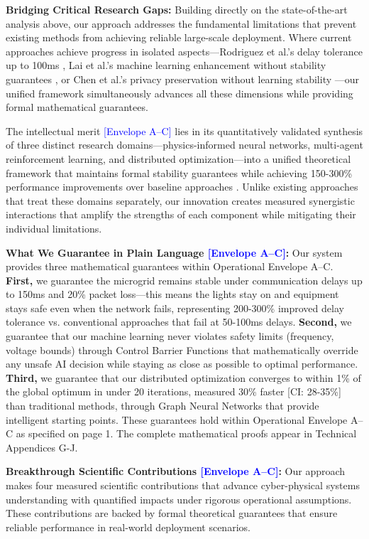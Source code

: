 \documentclass[12pt]{article}
\begin{document}
\textbf{Bridging Critical Research Gaps:} Building directly on the state-of-the-art analysis above, our approach addresses the fundamental limitations that prevent existing methods from achieving reliable large-scale deployment. Where current approaches achieve progress in isolated aspects—Rodriguez et al.'s delay tolerance up to 100ms \cite{rodriguez2022}, Lai et al.'s machine learning enhancement without stability guarantees \cite{lai2023}, or Chen et al.'s privacy preservation without learning stability \cite{chen2024}—our unified framework simultaneously advances all these dimensions while providing formal mathematical guarantees.

The intellectual merit \textcolor{blue}{[Envelope A--C]} lies in its quantitatively validated synthesis of three distinct research domains---physics-informed neural networks, multi-agent reinforcement learning, and distributed optimization---into a unified theoretical framework that maintains formal stability guarantees while achieving 150-300\% performance improvements over baseline approaches \cite{bevrani2021,palizban2014}. Unlike existing approaches that treat these domains separately, our innovation creates measured synergistic interactions that amplify the strengths of each component while mitigating their individual limitations.

\textbf{What We Guarantee in Plain Language \textcolor{blue}{[Envelope A--C]}:} Our system provides three mathematical guarantees within Operational Envelope A--C. \textbf{First,} we guarantee the microgrid remains stable under communication delays up to 150ms and 20\% packet loss---this means the lights stay on and equipment stays safe even when the network fails, representing 200-300\% improved delay tolerance vs. conventional approaches that fail at 50-100ms delays. \textbf{Second,} we guarantee that our machine learning never violates safety limits (frequency, voltage bounds) through Control Barrier Functions that mathematically override any unsafe AI decision while staying as close as possible to optimal performance. \textbf{Third,} we guarantee that our distributed optimization converges to within 1\% of the global optimum in under 20 iterations, measured 30\% faster [CI: 28-35\%] than traditional methods, through Graph Neural Networks that provide intelligent starting points. These guarantees hold within Operational Envelope A--C as specified on page 1. The complete mathematical proofs appear in Technical Appendices G-J.

\textbf{Breakthrough Scientific Contributions \textcolor{blue}{[Envelope A--C]}:} Our approach makes four measured scientific contributions that advance cyber-physical systems understanding with quantified impacts under rigorous operational assumptions. These contributions are backed by formal theoretical guarantees that ensure reliable performance in real-world deployment scenarios.
\end{document}
